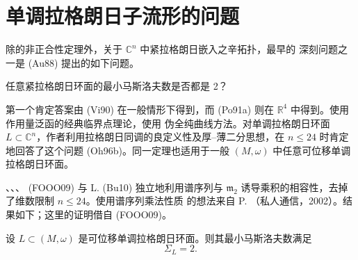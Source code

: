 \section{单调拉格朗日子流形的\personAudin{}问题}
\label{sec:audin-question-monotone}

除\personGromov{}的非正合性定理外，关于 $\mathbb C^n$ 中紧拉格朗日嵌入之辛拓扑，最早的
深刻问题之一是\personAudin{} (Au88) 提出的如下问题。

\begin{question}
\label{ques:audin-minimal-maslov-two}
任意紧拉格朗日环面的最小马斯洛夫数是否都是 2？
\end{question}

第一个肯定答案由\personViterbo{} (Vi90) 在一般情形下得到，而\personPolterovich{} (Po91a) 则在
$\mathbb R^4$ 中得到。\personViterbo{}使用作用量泛函的经典临界点理论，\personPolterovich{}使用
伪全纯曲线方法。对单调拉格朗日环面 $L\subset\mathbb C^n$，作者利用拉格朗日\personFloer{}同调的良定义性及厚--薄二分思想，在 $n\leq24$ 时肯定地回答了这个问题
(Oh96b)。同一定理也适用于一般 $(M,\omega)$ 中任意可位移单调拉格朗日环面。

\personFukaya{}、\personOh{}、\personOhta{}、\personOno{} (FOOO09) 与 L. \personBuhovsky{} (Bu10) 独立地利用谱序列与
$\mathfrak m_2$ 诱导乘积的相容性，去掉了维数限制 $n\leq24$。使用谱序列乘法性质
的想法来自 P. \personSeidel{}（私人通信，2002）。结果如下；这里的证明借自 (FOOO09)。

\begin{theorem}
\label{thm:audin-monotone-displaceable-torus}
设 $L\subset(M,\omega)$ 是可位移单调拉格朗日环面。则其最小马斯洛夫数满足
\[
 \Sigma_L=2.
\]
\end{theorem}

